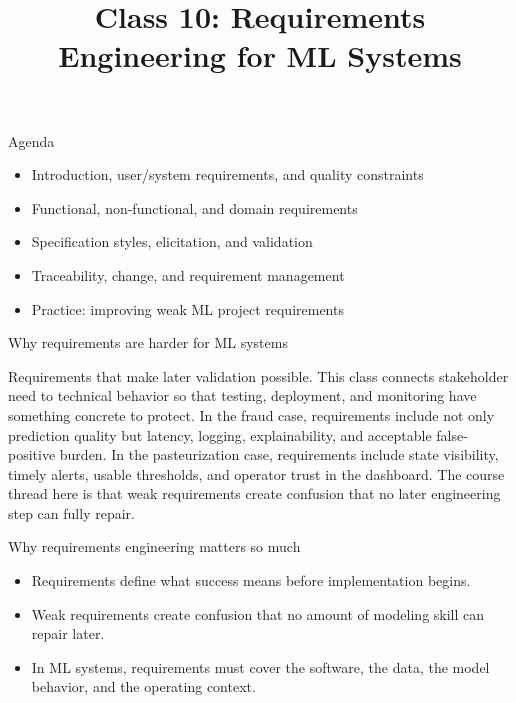 

\title{Class 10: Requirements Engineering for ML Systems}
\author{\coursename}
\date{}



\frame{\titlepage \coursefooter}

\begin{frame}{Agenda}
\begin{itemize}
\item Introduction, user/system requirements, and quality constraints
\item Functional, non-functional, and domain requirements
\item Specification styles, elicitation, and validation
\item Traceability, change, and requirement management
\item Practice: improving weak ML project requirements
\end{itemize}
\coursefooter
\end{frame}

\begin{frame}{Why requirements are harder for ML systems}
\coursefooter
\end{frame}

\coursecontextframe
{Requirements that make later validation possible.}
{This class connects stakeholder need to technical behavior so that testing, deployment, and monitoring have something concrete to protect.}
{In the fraud case, requirements include not only prediction quality but latency, logging, explainability, and acceptable false-positive burden.}
{In the pasteurization case, requirements include state visibility, timely alerts, usable thresholds, and operator trust in the dashboard.}
{The course thread here is that weak requirements create confusion that no later engineering step can fully repair.}

\begin{frame}{Why requirements engineering matters so much}
\begin{itemize}
\item Requirements define what success means before implementation begins.
\item Weak requirements create confusion that no amount of modeling skill can repair later.
\item In ML systems, requirements must cover the software, the data, the model behavior, and the operating context.
\end{itemize}
\coursefooter
\end{frame}

